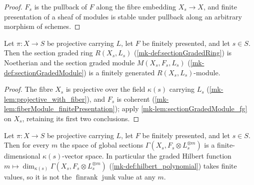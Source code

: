 \begin{proof}
  \leanok
  \(F_s\) is the pullback of \(F\) along the fibre embedding \(X_s \to X\), and
  finite presentation of a sheaf of modules is stable under pullback along an
  arbitrary morphism of schemes.
\end{proof}

\begin{lemma}
  \label{mk-lem:sectionGradedModule_fg_fiber}
  \leanok
  Let \(\pi : X \to S\) be projective carrying \(L\), let \(F\) be finitely
  presented, and let \(s \in S\).  Then the section graded ring \(R(X_s, L_s)\)
  (\ref{mk-def:sectionGradedRing}) is Noetherian and the section graded module
  \(M(X_s, F_s, L_s)\) (\ref{mk-def:sectionGradedModule}) is a finitely generated
  \(R(X_s, L_s)\)-module.
\end{lemma}

\begin{proof}
  The fibre \(X_s\) is projective over the field \(\kappa(s)\) carrying \(L_s\)
  (\ref{mk-lem:projective_with_fiber}), and \(F_s\) is coherent
  (\ref{mk-lem:fiberModule_finitePresentation}); apply
  \ref{mk-lem:sectionGradedModule_fg} on \(X_s\), retaining its first two
  conclusions.
\end{proof}

\begin{lemma}
  \label{mk-lem:hilbertFunction_finiteDimensional}
  \leanok
  Let \(\pi : X \to S\) be projective carrying \(L\), let \(F\) be finitely
  presented, and let \(s \in S\).  Then for every \(m\) the space of global
  sections \(\Gamma(X_s, F_s \otimes L_s^{\otimes m})\) is a finite-dimensional
  \(\kappa(s)\)-vector space.  In particular the graded Hilbert function
  \(m \mapsto \dim_{\kappa(s)} \Gamma(X_s, F_s \otimes L_s^{\otimes m})\)
  (\ref{mk-def:hilbert_polynomial}) takes finite values, so it is not the
  \(\operatorname{finrank}\) junk value at any \(m\).
\end{lemma}


